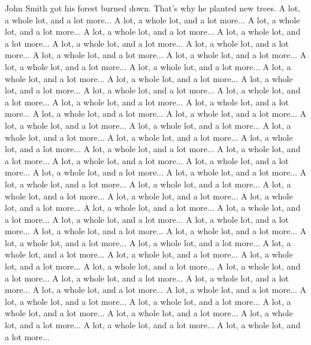 \documentclass[a0,portrait]{a0poster}
\begin{document}
\begin{poster}
\begin{multicols}{2}
John Smith got his forest burned down.
That's why he planted new trees.
A lot, a whole lot, and a lot more... A lot, a whole lot, and a lot more... A lot, a whole lot, and a lot more... A lot, a whole lot, and a lot more... A lot, a whole lot, and a lot more... A lot, a whole lot, and a lot more... A lot, a whole lot, and a lot more... A lot, a whole lot, and a lot more... A lot, a whole lot, and a lot more... A lot, a whole lot, and a lot more... A lot, a whole lot, and a lot more... A lot, a whole lot, and a lot more... A lot, a whole lot, and a lot more... A lot, a whole lot, and a lot more... A lot, a whole lot, and a lot more... A lot, a whole lot, and a lot more... A lot, a whole lot, and a lot more... A lot, a whole lot, and a lot more... A lot, a whole lot, and a lot more... A lot, a whole lot, and a lot more... A lot, a whole lot, and a lot more... A lot, a whole lot, and a lot more... A lot, a whole lot, and a lot more... A lot, a whole lot, and a lot more... A lot, a whole lot, and a lot more... A lot, a whole lot, and a lot more... A lot, a whole lot, and a lot more... A lot, a whole lot, and a lot more... A lot, a whole lot, and a lot more... A lot, a whole lot, and a lot more... A lot, a whole lot, and a lot more... A lot, a whole lot, and a lot more... A lot, a whole lot, and a lot more... A lot, a whole lot, and a lot more... A lot, a whole lot, and a lot more... A lot, a whole lot, and a lot more... A lot, a whole lot, and a lot more... A lot, a whole lot, and a lot more... A lot, a whole lot, and a lot more... A lot, a whole lot, and a lot more... A lot, a whole lot, and a lot more... A lot, a whole lot, and a lot more... A lot, a whole lot, and a lot more... A lot, a whole lot, and a lot more... A lot, a whole lot, and a lot more... A lot, a whole lot, and a lot more... A lot, a whole lot, and a lot more... A lot, a whole lot, and a lot more... A lot, a whole lot, and a lot more... A lot, a whole lot, and a lot more... A lot, a whole lot, and a lot more... A lot, a whole lot, and a lot more... A lot, a whole lot, and a lot more... A lot, a whole lot, and a lot more... A lot, a whole lot, and a lot more... A lot, a whole lot, and a lot more... A lot, a whole lot, and a lot more... A lot, a whole lot, and a lot more... A lot, a whole lot, and a lot more... A lot, a whole lot, and a lot more...

\end{multicols}
\end{poster}
\end{document}
